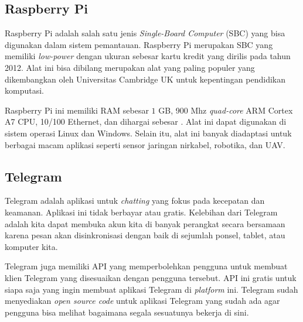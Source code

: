 \subsection{Raspberry Pi}
Raspberry Pi adalah salah satu jenis \textit{Single-Board Computer} (SBC) yang bisa digunakan dalam sistem pemantauan. Raspberry Pi merupakan SBC yang memiliki \textit{low-power} dengan ukuran sebesar kartu kredit yang dirilis pada tahun 2012. Alat ini bisa dibilang merupakan alat yang paling populer yang dikembangkan oleh Universitas Cambridge UK untuk kepentingan pendidikan komputasi.

Raspberry Pi ini memiliki RAM sebesar $1$ GB, 900 Mhz \textit{quad-core} ARM Cortex A7 CPU, 10/100 Ethernet, dan dihargai sebesar . Alat ini dapat digunakan di sistem operasi Linux dan Windows. Selain itu, alat ini banyak diadaptasi untuk berbagai macam aplikasi seperti sensor jaringan nirkabel, robotika, dan UAV.


\subsection{Telegram}
Telegram adalah aplikasi untuk \textit{chatting} yang fokus pada kecepatan dan keamanan. Aplikasi ini tidak berbayar atau gratis. Kelebihan dari Telegram adalah kita dapat membuka akun kita di banyak perangkat secara bersamaan karena pesan akan disinkronisasi dengan baik di sejumlah ponsel, tablet, atau komputer kita.

Telegram juga memiliki API yang memperbolehkan pengguna untuk membuat klien Telegram yang disesuaikan dengan pengguna tersebut. API ini gratis untuk siapa saja yang ingin membuat aplikasi Telegram di \textit{platform} ini. Telegram sudah menyediakan \textit{open source code} untuk aplikasi Telegram yang sudah ada agar pengguna bisa melihat bagaimana segala sesuatunya bekerja di sini.